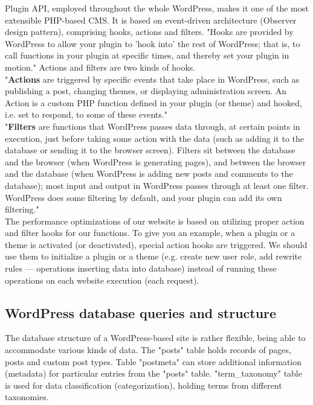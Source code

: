 Plugin API, employed throughout the whole WordPress, makes it one of the most extensible PHP-based CMS. It is based on event-driven architecture (Observer design pattern), comprising hooks, actions and filters. "Hooks are provided by WordPress to allow your plugin to 'hook into' the rest of WordPress; that is, to call functions in your plugin at specific times, and thereby set your plugin in motion." \cite{WP:Plugin-API} Actions and filters are two kinds of hooks. \\

"\textbf{Actions} are triggered by specific events that take place in WordPress, such as publishing a post, changing themes, or displaying administration screen. An Action is a custom PHP function defined in your plugin (or theme) and hooked, i.e. set to respond, to some of these events." \\

"\textbf{Filters} are functions that WordPress passes data through, at certain points in execution, just before taking some action with the data (such as adding it to the database or sending it to the browser screen). Filters sit between the database and the browser (when WordPress is generating pages), and between the browser and the database (when WordPress is adding new posts and comments to the database); most input and output in WordPress passes through at least one filter. WordPress does some filtering by default, and your plugin can add its own filtering." \\

The performance optimizations of our website is based on utilizing proper action and filter hooks for our functions. To give you an example, when a plugin or a theme is activated (or deactivated), special action hooks are triggered. We should use them to initialize a plugin or a theme (e.g. create new user role, add rewrite rules — operations inserting data into database) instead of running these operations on each website execution (each request).

\subsection{WordPress database queries and structure}

The database structure of a WordPress-based site is rather flexible, being able to accommodate various kinds of data. The "posts" table holds records of pages, posts and custom post types. \cite{WP:Post-Types} Table "postmeta" can store additional information (metadata) for particular entries from the "posts" table. "term\_taxonomy" table is used for data classification (categorization), holding terms from different taxonomies. \cite{WP:Taxonomies} \\

